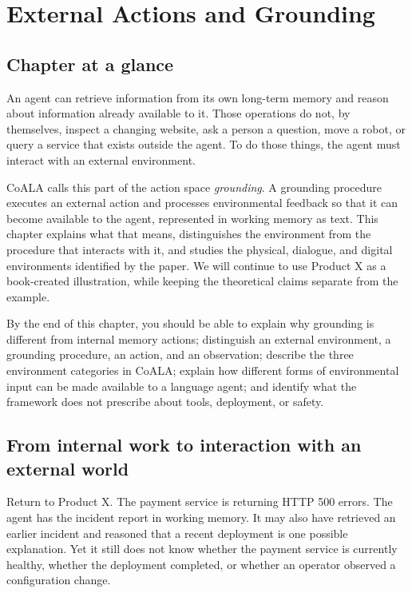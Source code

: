 \chapter{External Actions and Grounding}
\label{ch:external-actions-grounding}

\section*{Chapter at a glance}
{}

An agent can retrieve information from its own long-term memory and reason about information already available to it. Those operations do not, by themselves, inspect a changing website, ask a person a question, move a robot, or query a service that exists outside the agent. To do those things, the agent must interact with an external environment.

CoALA calls this part of the action space \emph{grounding}. A grounding procedure executes an external action and processes environmental feedback so that it can become available to the agent, represented in working memory as text. This chapter explains what that means, distinguishes the environment from the procedure that interacts with it, and studies the physical, dialogue, and digital environments identified by the paper. We will continue to use Product X as a book-created illustration, while keeping the theoretical claims separate from the example.

\begin{learningbox}
By the end of this chapter, you should be able to explain why grounding is different from internal memory actions; distinguish an external environment, a grounding procedure, an action, and an observation; describe the three environment categories in CoALA; explain how different forms of environmental input can be made available to a language agent; and identify what the framework does not prescribe about tools, deployment, or safety.
\end{learningbox}

\section{From internal work to interaction with an external world}
\label{sec:external-world}

Return to Product X. The payment service is returning HTTP 500 errors. The agent has the incident report in working memory. It may also have retrieved an earlier incident and reasoned that a recent deployment is one possible explanation. Yet it still does not know whether the payment service is currently healthy, whether the deployment completed, or whether an operator observed a configuration change.

